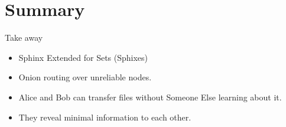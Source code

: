 \section{Summary}

\begin{frame}
  \begin{block}{Take away}
    \begin{itemize}
      \item Sphinx Extended for Sets (Sphixes)
      \item Onion routing over unreliable nodes.
      \item Alice and Bob can transfer files without Someone Else learning about 
        it.
      \item They reveal minimal information to each other.
    \end{itemize}
  \end{block}
\end{frame}



\begin{frame}[allowframebreaks]
  \printbibliography
\end{frame}
